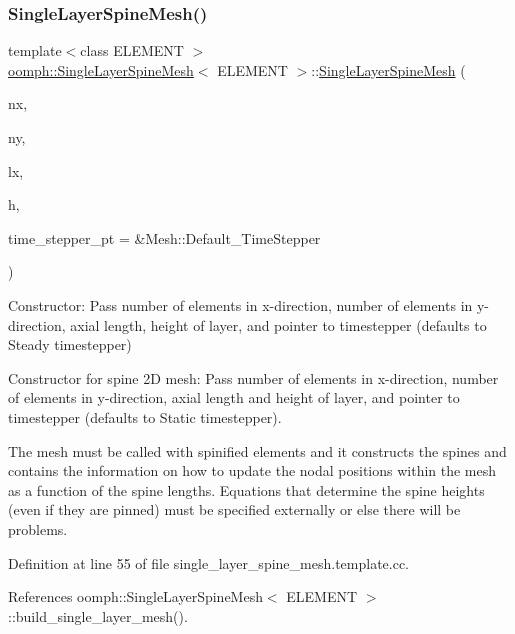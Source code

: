 \subsubsection{\texorpdfstring{Single\+Layer\+Spine\+Mesh()}{SingleLayerSpineMesh()}\hspace{0.1cm}{\footnotesize\ttfamily [1/2]}}
{\footnotesize\ttfamily template$<$class E\+L\+E\+M\+E\+NT $>$ \\
\hyperlink{classoomph_1_1SingleLayerSpineMesh}{oomph\+::\+Single\+Layer\+Spine\+Mesh}$<$ E\+L\+E\+M\+E\+NT $>$\+::\hyperlink{classoomph_1_1SingleLayerSpineMesh}{Single\+Layer\+Spine\+Mesh} (\begin{DoxyParamCaption}\item[{const unsigned \&}]{nx,  }\item[{const unsigned \&}]{ny,  }\item[{const double \&}]{lx,  }\item[{const double \&}]{h,  }\item[{Time\+Stepper $\ast$}]{time\+\_\+stepper\+\_\+pt = {\ttfamily \&Mesh\+:\+:Default\+\_\+TimeStepper} }\end{DoxyParamCaption})}



Constructor\+: Pass number of elements in x-\/direction, number of elements in y-\/direction, axial length, height of layer, and pointer to timestepper (defaults to Steady timestepper) 

Constructor for spine 2D mesh\+: Pass number of elements in x-\/direction, number of elements in y-\/direction, axial length and height of layer, and pointer to timestepper (defaults to Static timestepper).

The mesh must be called with spinified elements and it constructs the spines and contains the information on how to update the nodal positions within the mesh as a function of the spine lengths. Equations that determine the spine heights (even if they are pinned) must be specified externally or else there will be problems. 

Definition at line 55 of file single\+\_\+layer\+\_\+spine\+\_\+mesh.\+template.\+cc.



References oomph\+::\+Single\+Layer\+Spine\+Mesh$<$ E\+L\+E\+M\+E\+N\+T $>$\+::build\+\_\+single\+\_\+layer\+\_\+mesh().

\mbox{\label{classoomph_1_1SingleLayerSpineMesh_afb908e31d988eaa930e949a54eeea37f}} 
